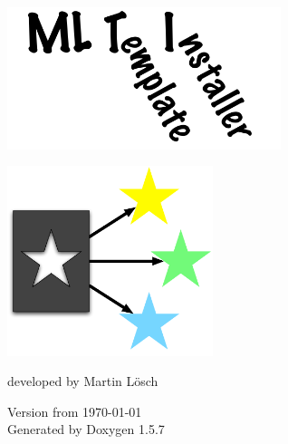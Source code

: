\documentclass[a4paper]{article}
\begin{document}
\begin{titlepage}


\vspace*{4cm}
\begin{center}

\includegraphics[width=8cm]{../../doc-src/images/mlti-projecttitle}

\vspace*{1cm}

\includegraphics[width=6cm]{../../doc-src/images/mlti-logo}

\vspace*{2cm}

{\Large developed by Martin L\"osch}

\end{center}


\begin{center}
\vspace*{1cm}
{\large Version from \today}\\
\vspace*{0.5cm}
{\small Generated by Doxygen 1.5.7}\\
\end{center}
\end{titlepage}
\tableofcontents
{}
\end{document}
